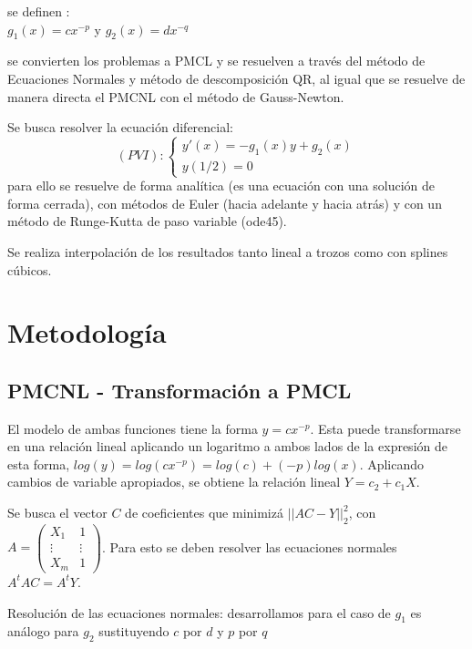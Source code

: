 \documentclass{endm}
\begin{document}
se definen :\\
$g_1(x)=c x^{-p} $ y $g_2(x)=d x^{-q} $

se convierten los problemas a PMCL y se resuelven a través del método de Ecuaciones Normales y método de descomposición QR, al igual que se resuelve de manera directa el PMCNL con el método de Gauss-Newton.

Se busca resolver la ecuación diferencial:
\begin{equation*}
    (PVI):\begin{cases}
        y'(x) = -g_1(x)y + g_2(x) \\
        y(1/2) = 0
    \end{cases}
\end{equation*}
para ello se resuelve de forma analítica (es una ecuación con una solución de forma cerrada), con métodos de Euler (hacia adelante y hacia atrás) y con un método de Runge-Kutta de paso variable (ode45).

Se realiza interpolación de los resultados tanto lineal a trozos como con splines cúbicos.
\section{Metodología}\label{AA}

\subsection{PMCNL - Transformación a PMCL}
El modelo de ambas funciones tiene la forma $y = cx^{-p}$. Esta puede transformarse en una relación
lineal aplicando un logaritmo a ambos lados de la expresión de esta forma, $log(y) = log(cx^{-p}) = log(c) + (-p)log(x)$.
Aplicando cambios de variable apropiados, se obtiene la relación lineal $Y = c_2 + c_1X$.

Se busca el vector $C$ de coeficientes que minimizá $||AC - Y||^2_2$,
con $A = \begin{pmatrix}X_1 & 1 \\ \vdots & \vdots \\ X_m & 1 \end{pmatrix}$.
Para esto se deben resolver las ecuaciones normales $A^tAC = A^tY$.

Resolución de las ecuaciones normales:
desarrollamos para el caso de $g_{1}$ es análogo para $g_{2}$ sustituyendo $c$ por $d$ y $p$ por $q$ 
\end{document}
